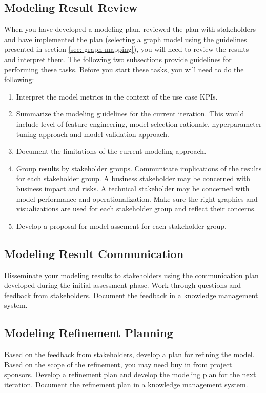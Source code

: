 \documentclass{article}
\begin{document}
\subsection{Modeling Result Review}
When you have developed a modeling plan, reviewed the plan with stakeholders and have implemented the plan (selecting a graph model using the guidelines presented in section \ref{sec: graph mapping}), you will need to review the results and interpret them. The following two subsections provide guidelines for performing these tasks. Before you start these tasks, you will need to do the following:
\begin{enumerate}
\item Interpret the model metrics in the context of the use case KPIs.
\item Summarize the modeling guidelines for the current iteration. This would include level of feature engineering, model selection rationale, hyperparameter tuning approach and model validation approach.
\item Document the limitations of the current modeling approach. 
\item Group results by stakeholder groups. Communicate implications of the results for each stakeholder group. A business stakeholder may be concerned with business impact and risks. A technical stakeholder may be concerned with model performance and operationalization. Make sure the right graphics and visualizations are used for each stakeholder group and reflect their concerns.
\item Develop a proposal for model assement for each stakeholder group.
\end{enumerate}

\subsection{Modeling Result Communication}
Disseminate your modeling results to stakeholders using the communication plan developed during the initial assessment phase. Work through questions and feedback from stakeholders. Document the feedback in a knowledge management system.

\subsection{Modeling Refinement Planning}
Based on the feedback from stakeholders, develop a plan for refining the model. Based on the scope of the refinement, you may need buy in from project sponsors. Develop a refinement plan and develop the modeling plan for the next iteration. Document the refinement plan in a knowledge management system.
\end{document}
